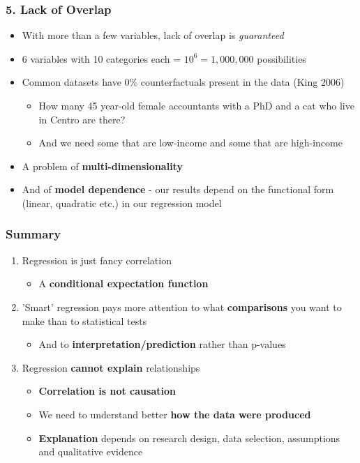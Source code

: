 \documentclass[xcolor=x11names,compress]{beamer}\usepackage[]{graphicx}\usepackage[]{color}
\renewcommand{\(}{\begin{columns}}
\renewcommand{\)}{\end{columns}}
\newcommand{\<}[1]{\begin{column}{#1}}
\renewcommand{\>}{\end{column}}
\begin{document}
\begin{frame}
\frametitle{5. Lack of Overlap}
\begin{itemize}
\item With more than a few variables, lack of overlap is \textit{guaranteed}
\pause
\item 6 variables with 10 categories each = $10^6 = 1,000,000$ possibilities
\pause
\item Common datasets have 0\% counterfactuals present in the data (King 2006)
\pause
\begin{itemize}
\item How many 45 year-old female accountants with a PhD and a cat who live in Centro are there?
\pause
\item And we need some that are low-income and some that are high-income
\end{itemize}
\pause
\item A problem of \textbf{multi-dimensionality}
\pause
\item And of \textbf{model dependence} - our results depend on the functional form (linear, quadratic etc.) in our regression model
\end{itemize}
\end{frame}

\begin{frame}
\frametitle{Summary}
\begin{enumerate}
\item Regression is just fancy correlation
\begin{itemize}
\item A \textbf{conditional expectation function}
\pause
\end{itemize}
\item 'Smart' regression pays more attention to what \textbf{comparisons} you want to make than to statistical tests
\begin{itemize}
\item And to \textbf{interpretation/prediction} rather than p-values
\end{itemize}
\pause
\item Regression \textbf{cannot explain} relationships
\begin{itemize}
\item \textbf{Correlation is not causation}
\pause
\item We need to understand better \textbf{how the data were produced}
\pause
\item \textbf{Explanation} depends on research design, data selection, assumptions and qualitative evidence
\end{itemize}
\end{enumerate}
\end{frame}
\end{document}
